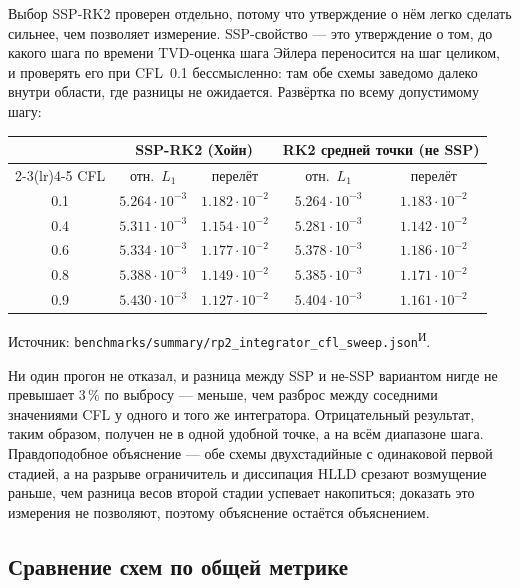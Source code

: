 \documentclass[12pt,a4paper]{article}
\newcommand{\code}[1]{\texttt{#1}}
\newcommand{\Iz}{\textsuperscript{\scriptsize И}}    %
\begin{document}
\medskip
Выбор SSP-RK2 проверен отдельно, потому что утверждение о нём легко сделать
сильнее, чем позволяет измерение. SSP-свойство --- это утверждение о том, до
какого шага по времени TVD-оценка шага Эйлера переносится на шаг целиком, и
проверять его при CFL~0.1 бессмысленно: там обе схемы заведомо далеко внутри
области, где разницы не ожидается. Развёртка по всему допустимому шагу:

\begin{center}\footnotesize\setlength{\tabcolsep}{6pt}
\begin{tabular}{ccccc}
\toprule
& \multicolumn{2}{c}{SSP-RK2 (Хойн)} & \multicolumn{2}{c}{RK2 средней точки (не SSP)} \\
\cmidrule(lr){2-3}\cmidrule(lr){4-5}
CFL & отн.\ $L_1$ & перелёт & отн.\ $L_1$ & перелёт \\
\midrule
0.1 & $5.264\!\cdot\!10^{-3}$ & $1.182\!\cdot\!10^{-2}$ & $5.264\!\cdot\!10^{-3}$ & $1.183\!\cdot\!10^{-2}$ \\
0.4 & $5.311\!\cdot\!10^{-3}$ & $1.154\!\cdot\!10^{-2}$ & $5.281\!\cdot\!10^{-3}$ & $1.142\!\cdot\!10^{-2}$ \\
0.6 & $5.334\!\cdot\!10^{-3}$ & $1.177\!\cdot\!10^{-2}$ & $5.378\!\cdot\!10^{-3}$ & $1.186\!\cdot\!10^{-2}$ \\
0.8 & $5.388\!\cdot\!10^{-3}$ & $1.149\!\cdot\!10^{-2}$ & $5.385\!\cdot\!10^{-3}$ & $1.171\!\cdot\!10^{-2}$ \\
0.9 & $5.430\!\cdot\!10^{-3}$ & $1.127\!\cdot\!10^{-2}$ & $5.404\!\cdot\!10^{-3}$ & $1.161\!\cdot\!10^{-2}$ \\
\bottomrule
\end{tabular}
\end{center}
\noindent\footnotesize
Источник: \code{benchmarks/summary/rp2\_integrator\_cfl\_sweep.json}\Iz.\normalsize

\medskip
Ни один прогон не отказал, и разница между SSP и не-SSP вариантом нигде не
превышает $3\,\%$ по выбросу --- меньше, чем разброс между соседними значениями
CFL у одного и того же интегратора. Отрицательный результат, таким образом,
получен не в одной удобной точке, а на всём диапазоне шага. Правдоподобное
объяснение --- обе схемы двухстадийные с одинаковой первой стадией, а на разрыве
ограничитель и диссипация HLLD срезают возмущение раньше, чем разница весов
второй стадии успевает накопиться; доказать это измерения не позволяют, поэтому
объяснение остаётся объяснением.

\subsection{Сравнение схем по общей метрике}
\label{sec:res-rp3}
\end{document}
